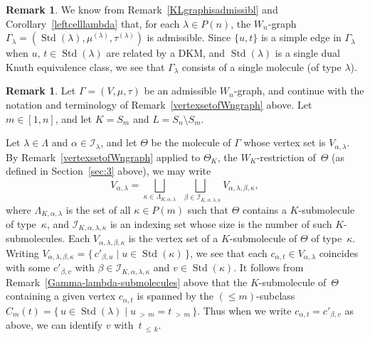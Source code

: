 \documentclass[10pt]{amsart}
\theoremstyle{definition}
\newtheorem{rema}[theo]{Remark}
\newcommand{\morethan}[2]{#1\,{_{>\,#2}}}
\newcommand{\Lessthan}[2]{#1\,{_{\leqslant\,#2}}}
\DeclareMathOperator{\STD}{Std}
\begin{document}
\begin{rema}\label{Gamma-lambdaIsAdmissible}
We know from Remark~\ref{KLgraphisadmissibl} and Corollary~\ref{leftcelllambda} that, for each
$\lambda\in P(n)$, the $W_n$-graph $\Gamma_{\lambda}=(\STD(\lambda),\mu^{(\lambda)},\tau^{(\lambda)})$
is admissible. Since $\{u,t\}$ is a simple edge in $\Gamma_{\lambda}$
when $u,\, t\in\STD(\lambda)$ are related by a
DKM, and $\STD(\lambda)$ is a single dual Knuth equivalence class, we see that
$\Gamma_{\lambda}$ consists of a single molecule (of type $\lambda$).
\end{rema}

\begin{rema}\label{restrictionrem}
Let $\Gamma=(V,\mu,\tau)$ be an admissible $W_n$-graph, and continue
with the notation and terminology of Remark~\ref{vertexsetofWngraph}
above. Let $m\in [1,n]$, and let $K=S_m$ and $L=S_n\setminus S_m$.

Let $\lambda\in\Lambda$ and $\alpha\in\mathcal I_\lambda$, and let $\Theta$
be the molecule of $\Gamma$ whose vertex set is $V_{\alpha,\lambda}$.
By Remark~\ref{vertexsetofWngraph} applied to $\Theta_K$, the $W_K$-restriction
of~$\Theta$ (as defined in Section~\ref{sec:3} above), we may write
\[
V_{\alpha,\lambda}=\bigsqcup_{\kappa\in\Lambda_{K,\alpha,\lambda}}
\bigsqcup_{\,\,\,\,\beta\in\mathcal{I}_{K,\alpha,\lambda,\kappa}\!\!\!\!}\!\!V_{\alpha,\lambda,\beta,\kappa},
\]
where $\Lambda_{K,\alpha,\lambda}$ is the set of all $\kappa\in P(m)$ such that
$\Theta$ contains a $K$-submolecule of type~$\kappa$, and
$\mathcal I_{K,\alpha,\lambda,\kappa}$ is an indexing set whose size is
the number of such $K$-submolecules. Each $V_{\alpha,\lambda,\beta,\kappa}$
is the vertex set of a $K$-submolecule of $\Theta$ of type~$\kappa$. Writing
$V_{\alpha,\lambda,\beta,\kappa}=\{\,c'_{\beta,u}\mid u\in\STD(\kappa)\,\}$,
we see that each $c_{\alpha,t}\in V_{\alpha,\lambda}$ coincides with some
$c'_{\beta,v}$ with $\beta\in\mathcal I_{K,\alpha,\lambda,\kappa}$ and
$v\in\STD(\kappa)$.
It follows from Remark~\ref{Gamma-lambda-submolecules} above that the
$K$-submolecule of~$\Theta$ containing a given vertex $c_{\alpha,t}$ is
spanned by the
$(\leqslant m)$-subclass~$C_m(t)=\{\,u\in\STD(\lambda)\mid\morethan um=\morethan tm\,\}$.
Thus when we write $c_{\alpha,t}=c'_{\beta,v}$ as above, we can identify
$v$ with~$\Lessthan tk$.


\end{rema}
\end{document}
